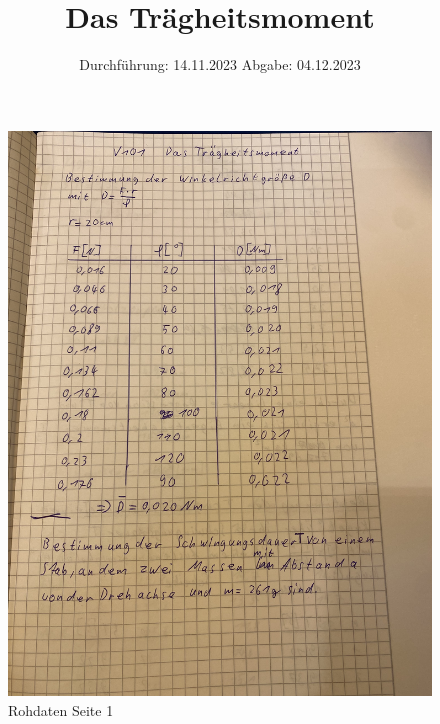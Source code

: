 

\subject{V101}
\title{Das Trägheitsmoment}
\date{%
  Durchführung: 14.11.2023
  \hspace{3em}
  Abgabe: 04.12.2023
}



\maketitle
\thispagestyle{empty}
\tableofcontents
\newpage








\begin{figure}
  \centering
  \includegraphics[width=\textwidth, angle=270]{Bilder/Data1.jpg}
  \caption{Rohdaten Seite 1}
  \label{fig:Data1}
\end{figure}
